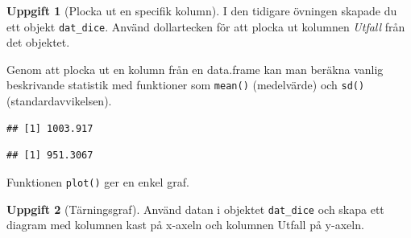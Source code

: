 \documentclass[
]{book}
\newenvironment{Shaded}{\begin{snugshade}}{\end{snugshade}}
\newcommand{\FunctionTok}[1]{\textcolor[rgb]{0.13,0.29,0.53}{\textbf{#1}}}
\newcommand{\NormalTok}[1]{#1}
\newcommand{\SpecialCharTok}[1]{\textcolor[rgb]{0.81,0.36,0.00}{\textbf{#1}}}
\theoremstyle{definition}
\theoremstyle{definition}
\theoremstyle{definition}
\newtheorem{exercise}{Uppgift}[chapter]
\theoremstyle{definition}
\theoremstyle{remark}
\begin{document}
\begin{exercise}[Plocka ut en specifik kolumn]

I den tidigare övningen skapade du ett objekt \texttt{dat\_dice}. Använd dollartecken för att plocka ut kolumnen \emph{Utfall} från det objektet.

\begin{Shaded}
\end{Shaded}

\end{exercise}

Genom att plocka ut en kolumn från en data.frame kan man beräkna vanlig beskrivande statistik med funktioner som \texttt{mean()} (medelvärde) och \texttt{sd()} (standardavvikelsen).

\begin{Shaded}
\end{Shaded}

\begin{verbatim}
## [1] 1003.917
\end{verbatim}

\begin{Shaded}
\end{Shaded}

\begin{verbatim}
## [1] 951.3067
\end{verbatim}

Funktionen \texttt{plot()} ger en enkel graf.

\begin{Shaded}
\end{Shaded}

\begin{exercise}[Tärningsgraf]

Använd datan i objektet \texttt{dat\_dice} och skapa ett diagram med kolumnen kast på x-axeln och kolumnen Utfall på y-axeln.

\begin{Shaded}
\end{Shaded}

\end{exercise}
\end{document}
